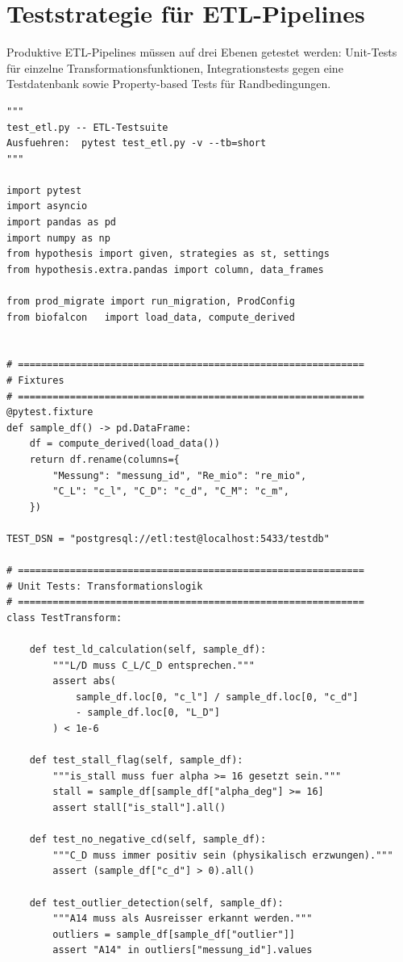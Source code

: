 ﻿\documentclass[12pt,a4paper]{report}
\theoremstyle{definition}
\theoremstyle{remark}
\begin{document}
\section{Teststrategie für ETL-Pipelines}

Produktive ETL-Pipelines müssen auf drei Ebenen getestet werden:
Unit-Tests für einzelne Transformationsfunktionen,
Integrationstests gegen eine Testdatenbank sowie
Property-based Tests für Randbedingungen.

\begin{lstlisting}[style=python, caption={test\_etl.py: Vollständige Testsuite mit pytest und hypothesis}]
"""
test_etl.py -- ETL-Testsuite
Ausfuehren:  pytest test_etl.py -v --tb=short
"""

import pytest
import asyncio
import pandas as pd
import numpy as np
from hypothesis import given, strategies as st, settings
from hypothesis.extra.pandas import column, data_frames

from prod_migrate import run_migration, ProdConfig
from biofalcon   import load_data, compute_derived


# ============================================================
# Fixtures
# ============================================================
@pytest.fixture
def sample_df() -> pd.DataFrame:
    df = compute_derived(load_data())
    return df.rename(columns={
        "Messung": "messung_id", "Re_mio": "re_mio",
        "C_L": "c_l", "C_D": "c_d", "C_M": "c_m",
    })

TEST_DSN = "postgresql://etl:test@localhost:5433/testdb"

# ============================================================
# Unit Tests: Transformationslogik
# ============================================================
class TestTransform:

    def test_ld_calculation(self, sample_df):
        """L/D muss C_L/C_D entsprechen."""
        assert abs(
            sample_df.loc[0, "c_l"] / sample_df.loc[0, "c_d"]
            - sample_df.loc[0, "L_D"]
        ) < 1e-6

    def test_stall_flag(self, sample_df):
        """is_stall muss fuer alpha >= 16 gesetzt sein."""
        stall = sample_df[sample_df["alpha_deg"] >= 16]
        assert stall["is_stall"].all()

    def test_no_negative_cd(self, sample_df):
        """C_D muss immer positiv sein (physikalisch erzwungen)."""
        assert (sample_df["c_d"] > 0).all()

    def test_outlier_detection(self, sample_df):
        """A14 muss als Ausreisser erkannt werden."""
        outliers = sample_df[sample_df["outlier"]]
        assert "A14" in outliers["messung_id"].values



\end{lstlisting}
\end{document}
